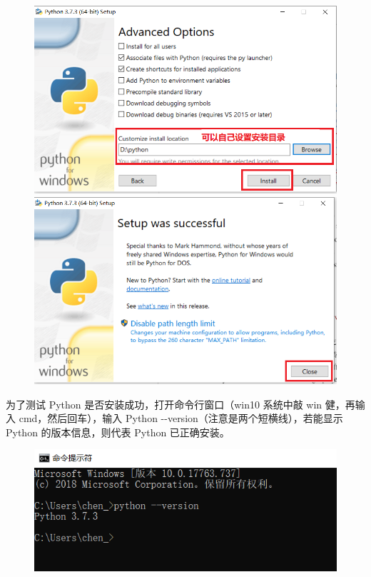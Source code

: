 \clearpage
\begin{figure}[ht]
  \centering
  \includegraphics[scale=0.4]{figure/chapter1/PythonDownload5.png}\quad
  \includegraphics[scale=0.4]{figure/chapter1/PythonDownload6.png}
\end{figure}

为了测试 Python 是否安装成功，打开命令行窗口（win10 系统中敲 win 健，再输入 cmd，然后回车），输入 Python -{}-version（注意是两个短横线），若能显示 Python 的版本信息，则代表 Python 已正确安装。

\begin{figure}[!ht]
  \centering
  \includegraphics[scale=0.7]{figure/chapter1/PythonDownload3.png}
\end{figure}

